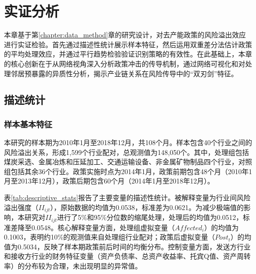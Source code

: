 \chapter{实证分析}
\label{chap:empirical}



本章基于第\ref{chapter:data_method}章的研究设计，对去产能政策的风险溢出效应进行实证检验。首先通过描述性统计展示样本特征，然后运用双重差分法估计政策的平均处理效应，并通过平行趋势检验验证识别策略的有效性。在此基础上，本章的核心创新在于从网络视角深入分析政策冲击的传导机制，通过网络可视化和对处理邻居预暴露的异质性分析，揭示产业链关系在风险传导中的“双刃剑”特征。



\section{描述统计}
\label{sec:descriptive}

\subsection{样本基本特征}

本研究的样本期为2010年1月至2018年12月，共108个月。样本包含40个行业之间的风险溢出关系，形成1,599个行业配对，总观测值为148,050个。其中，处理组包括煤炭采选、金属冶炼和压延加工、交通运输设备、非金属矿物制品四个行业，对照组包括其余36个行业。政策实施时点为2014年1月，政策前期包含48个月（2010年1月至2013年12月），政策后期包含60个月（2014年1月至2018年12月）。

表\ref{tab:descriptive_stats}报告了主要变量的描述性统计。被解释变量为行业间风险溢出强度（$II_{ijt}$），原始数据的均值为0.0538，标准差为0.0621。为减少极端值的影响，本研究对$II_{ijt}$进行了5\%和95\%分位数的缩尾处理，处理后的均值为0.0512，标准差降至0.0548。核心解释变量方面，处理组虚拟变量（$Affected_i$）的均值为0.1003，表明约10\%的观测值来自处理组行业配对；政策后虚拟变量（$Post_t$）的均值为0.5034，反映了样本期政策前后时间的均衡分布。控制变量方面，发送方行业和接收方行业的财务特征变量（资产负债率、总资产收益率、托宾Q值、资产周转率）的分布较为合理，未出现明显的异常值。

